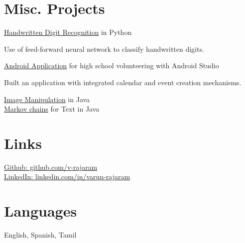 \documentclass[]{deedy-resume-openfont}
\begin{document}
\begin{minipage}[t]{0.33\textwidth}

\section{Misc. Projects}
\underline{Handwritten Digit Recognition} in Python \\
\vspace{3 mm}
\begin{tightemize}
\item Use of feed-forward neural network to classify handwritten digits. 
\end{tightemize}
\vspace{1 mm}
\underline{Android Application} for high school volunteering with Android Studio
\begin{tightemize}
\item Built an application with integrated calendar and event creation mechanisms. 
\end{tightemize}
\vspace{1 mm}
\underline{Image Manipulation} in Java \\
\vspace{1 mm}
\underline{Markov chains} for Text in Java \\
\vspace{1 mm}




\vspace{2 mm}
\section{Links} 
\href{github.com/v-rajaram}{Github: github.com/v-rajaram} \\
\vspace{1 mm}
\href{linkedin.com/in/varun-rajaram}{LinkedIn: linkedin.com/in/varun-rajaram}


\vspace{2 mm}
\section{Languages}
English, Spanish, Tamil \\

%
%

\end{minipage} 
\end{document}
